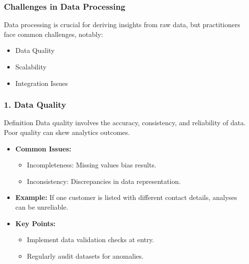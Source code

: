 \documentclass[aspectratio=169]{beamer}
\begin{document}
\begin{frame}
    \frametitle{Challenges in Data Processing}
    Data processing is crucial for deriving insights from raw data, but practitioners face common challenges, notably:
    \begin{itemize}
        \item Data Quality
        \item Scalability
        \item Integration Issues
    \end{itemize}
\end{frame}

\begin{frame}
    \frametitle{1. Data Quality}
    \begin{block}{Definition}
        Data quality involves the accuracy, consistency, and reliability of data. Poor quality can skew analytics outcomes.
    \end{block}
    \begin{itemize}
        \item \textbf{Common Issues:}
        \begin{itemize}
            \item Incompleteness: Missing values bias results.
            \item Inconsistency: Discrepancies in data representation.
        \end{itemize}
        \item \textbf{Example:}
            If one customer is listed with different contact details, analyses can be unreliable.
        \item \textbf{Key Points:}
        \begin{itemize}
            \item Implement data validation checks at entry.
            \item Regularly audit datasets for anomalies.
        \end{itemize}
    \end{itemize}
\end{frame}
\end{document}
